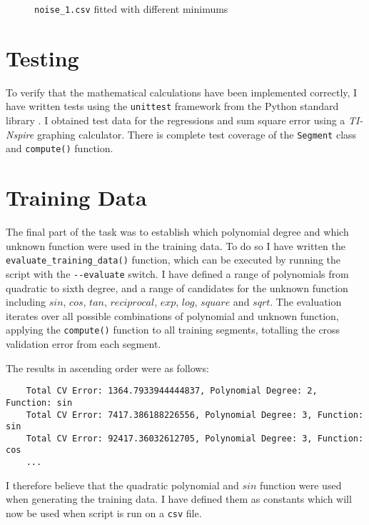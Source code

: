 \documentclass[11pt,a4paper]{scrartcl}
\begin{document}
\begin{figure}
	\centering
	\qquad
	\caption{\lstinline|noise_1.csv| fitted with different minimums}
	\label{fig:noise_1}
\end{figure}

\section{Testing}

To verify that the mathematical calculations have been implemented correctly, I have written tests using the \lstinline|unittest| framework from the Python standard library \cite{unittest}. I obtained test data for the regressions and sum square error using a \textit{TI-Nspire} graphing calculator. There is complete test coverage of the \lstinline|Segment| class and \lstinline|compute()| function.


\section{Training Data}

The final part of the task was to establish which polynomial degree and which unknown function were used in the training data. To do so I have written the \lstinline|evaluate_training_data()| function, which can be executed by running the script with the \lstinline|--evaluate| switch. I have defined a range of polynomials from quadratic to sixth degree, and a range of candidates for the unknown function including $sin$, $cos$, $tan$, $reciprocal$, $exp$, $log$, $square$ and $sqrt$. The evaluation iterates over all possible combinations of polynomial and unknown function, applying the \lstinline|compute()| function to all training segments, totalling the cross validation error from each segment.

The results in ascending order were as follows:

\begin{lstlisting}
	Total CV Error: 1364.7933944444837, Polynomial Degree: 2, Function: sin
	Total CV Error: 7417.386188226556, Polynomial Degree: 3, Function: sin
	Total CV Error: 92417.36032612705, Polynomial Degree: 3, Function: cos
	...
\end{lstlisting}

I therefore believe that the quadratic polynomial and $sin$ function were used when generating the training data. I have defined them as constants which will now be used when script is run on a \lstinline|csv| file.

\printbibliography
\end{document}
